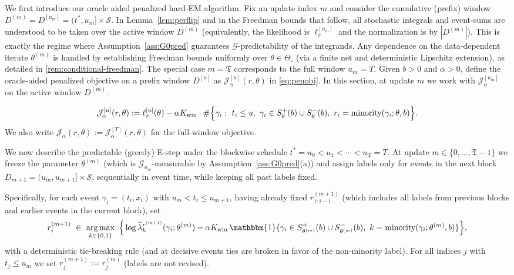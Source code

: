 \documentclass{statsoc}
\newcommand{\1}{\mathbbm{1}}
\newcommand{\Tmax}{\mathfrak{T}}
\DeclareMathOperator*{\argmax}{arg\,max}
\begin{document}
We first introduce our oracle aided penalized hard-EM algorithm. Fix an update index $m$ and consider the cumulative (prefix) window $D^{(m)}=D^{[u_m]}=(t^\ast,u_m]\times\mathcal S$. In Lemma~\ref{lem:perflip} and in the Freedman bounds that follow, all stochastic integrals and event-sums are
understood to be taken over the active window $D^{(m)}$ (equivalently, the likelihood is $\ell_r^{[u_m]}$ and the
normalization is by $|D^{(m)}|$).
This is exactly the regime where Assumption~\ref{ass:G0pred} guarantees $\mathcal G$-predictability of the integrands. Any dependence on the data-dependent iterate $\theta^{(m)}$ is handled by establishing Freedman bounds uniformly over $\theta\in\Theta_\circ$ (via a finite net and deterministic Lipschitz extension), as detailed in \cref{rem:conditional-freedman}. The special case $m=\Tmax$ corresponds to the full window $u_m=T$. Given $b>0$ and $\alpha>0$, define the oracle-aided penalized objective on a prefix window $D^{[u]}$ as $\mathcal J_\alpha^{[u]}(r,\theta)$ in \eqref{eq:penobj}. In this section, at update $m$ we work with $\mathcal J_\alpha^{[u_m]}$ on the active window $D^{(m)}$.


\begin{equation}\label{eq:penobj}
\mathcal J_\alpha^{[u]}(r,\theta)
:=\ell_r^{[u]}(\theta)
-\alpha K_{\rm win}\cdot
\#\Big\{\gamma_i:\ t_i\le u,\ \gamma_i\in S_\theta^+(b)\cup S_\theta^-(b),\ r_i=\text{minority}(\gamma_i;\theta,b)\Big\}.
\end{equation}
We also write $\mathcal J_\alpha(r,\theta):=\mathcal J_\alpha^{[T]}(r,\theta)$ for the full-window objective.

We now describe the predictable (greedy) E-step under the blockwise schedule
$t^\ast=u_0<u_1<\cdots<u_{\Tmax}=T$.
At update $m\in\{0,\dots,\Tmax-1\}$ we freeze the parameter $\theta^{(m)}$
(which is $\mathcal G_{u_m}$-measurable by Assumption~\ref{ass:G0pred}(a))
and assign labels only for events in the next block $D_{m+1}=(u_m,u_{m+1}]\times\mathcal S$,
sequentially in event time, while keeping all past labels fixed.

Specifically, for each event $\gamma_i=(t_i,x_i)$ with $u_m<t_i\le u_{m+1}$,
having already fixed $r^{(m+1)}_{1:i-1}$ (which includes all labels from previous blocks and earlier events in the current block),
set
\begin{align}\label{eq:greedy-estep}
r_i^{(m+1)}\ \in\ \argmax_{k\in\{0,1\}}\ 
\Big\{
\log \widehat\lambda_{k}^{r^{(m+1)}}(\gamma_i;\theta^{(m)})
-\alpha K_{\rm win}\,\1\{\gamma_i\in S^+_{\theta^{(m)}}(b)\cup S^-_{\theta^{(m)}}(b),\ k=\text{minority}(\gamma_i;\theta^{(m)},b)\}
\Big\},
\end{align}
with a deterministic tie-breaking rule (and at decisive events ties are broken in favor of the non-minority label).
For all indices $j$ with $t_j\le u_m$ we set $r_j^{(m+1)}:=r_j^{(m)}$ (labels are not revised).
\end{document}
